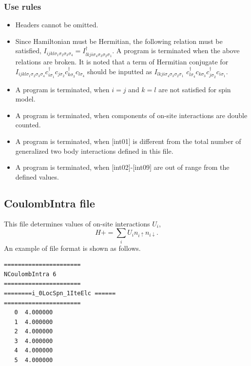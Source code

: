 \subsubsection{Use rules}
\begin{itemize}
\item Headers cannot be omitted. 
\item Since Hamiltonian must be Hermitian, the following relation must be satisfied, $I_{ijkl\sigma_1\sigma_2\sigma_3\sigma_4}=I_{lkji\sigma_4\sigma_3\sigma_2\sigma_1}^{\dag}$. A program is terminated when the above relations are broken.
It is noted that a term of Hermitian conjugate for $I_{ijkl\sigma_1\sigma_2\sigma_3\sigma_4}c_{i\sigma_1}^{\dagger}c_{j\sigma_2}c_{k\sigma_3}^{\dagger}c_{l\sigma_4}$ should be inputted as $I_{lkji\sigma_4\sigma_3\sigma_2\sigma_1}$ $c_{l\sigma_4}^{\dagger}c_{k\sigma_3}c_{j\sigma_2}^{\dagger}c_{i\sigma_1}$.
\item {A program is terminated, when $i=j$ and $k=l$ are not satisfied for spin model.}
\item A program is terminated, when components of on-site interactions are double counted.
\item A program is terminated, when $[$int01$]$ is different from the total number of generalized two body interactions defined in this file.
\item A program is terminated, when $[$int02$]$-$[$int09$]$ are out of range from the defined values.
\end{itemize}

\newpage
\subsection{CoulombIntra file}
This file determines values of on-site interactions $U_i$,
\begin{equation}
H+=\sum_{i}U_i n_ {i \uparrow}n_{i \downarrow}.
\end{equation}
An example of file format is shown as follows.

\begin{minipage}{12.5cm}
\begin{screen}
\begin{verbatim}
====================== 
NCoulombIntra 6  
====================== 
========i_0LocSpn_1IteElc ====== 
====================== 
   0  4.000000
   1  4.000000
   2  4.000000
   3  4.000000
   4  4.000000
   5  4.000000
\end{verbatim}
\end{screen}
\end{minipage}

